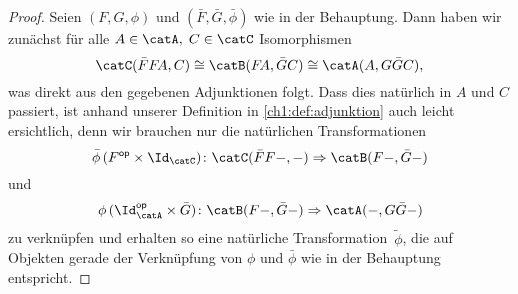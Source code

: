 \begin{proof}
    Seien $(F,G,\phi)$ und $(\bar F,\bar G,\bar\phi)$ wie in der Behauptung.
    Dann haben wir zunächst für alle $A\in\catA,\; C\in\catC$ Isomorphismen
    \[  \catC(\bar F F\!A, C) \cong 
        \catB(F\!A,\bar G C)  \cong 
        \catA(A, G\bar G C)
    , \]
    was direkt aus den gegebenen Adjunktionen folgt. Dass dies natürlich in $A$
    und $C$ passiert, ist anhand unserer Definition in \ref{ch1:def:adjunktion}
    auch leicht ersichtlich, denn wir brauchen nur die natürlichen
    Transformationen
    \[ \bar\phi\,(F\op\times\Id_\catC)\colon
        \catC(\bar F F\blank,\blank) \nattrafoto \catB(F\blank,\bar G\blank)
    \]
    und
    \[ \phi\,(\Id_\catA\op\times\bar G)\colon  
        \catB(F\blank,\bar G\blank) \nattrafoto \catA(\blank,G\bar G\blank)
    \]
    zu verknüpfen und erhalten so eine natürliche Transformation~$\tilde\phi$,
    die auf Objekten gerade der Verknüpfung von $\phi$ und $\bar\phi$ wie in der
    Behauptung entspricht.


\end{proof}
